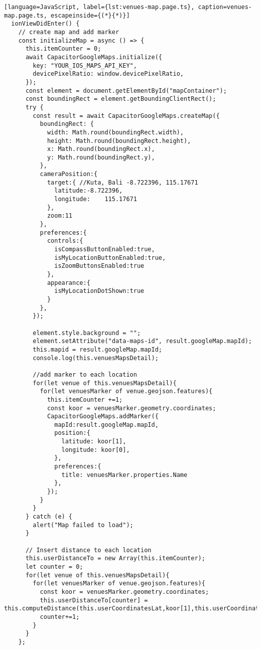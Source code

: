 \begin{lstlisting}[language=JavaScript, label={lst:venues-map.page.ts}, caption=venues-map.page.ts, escapeinside={(*}{*)}]
  ionViewDidEnter() {
    // create map and add marker
    const initializeMap = async () => {
      this.itemCounter = 0;
      await CapacitorGoogleMaps.initialize({
        key: "YOUR_IOS_MAPS_API_KEY",
        devicePixelRatio: window.devicePixelRatio,
      });
      const element = document.getElementById("mapContainer");
      const boundingRect = element.getBoundingClientRect();
      try {
        const result = await CapacitorGoogleMaps.createMap({
          boundingRect: {
            width: Math.round(boundingRect.width),
            height: Math.round(boundingRect.height),
            x: Math.round(boundingRect.x),
            y: Math.round(boundingRect.y),
          },
          cameraPosition:{
            target:{ //Kuta, Bali -8.722396, 115.17671
              latitude:-8.722396, 
              longitude: 	115.17671
            },
            zoom:11
          },
          preferences:{
            controls:{
              isCompassButtonEnabled:true,
              isMyLocationButtonEnabled:true,
              isZoomButtonsEnabled:true
            },
            appearance:{
              isMyLocationDotShown:true
            }
          },
        });
        
        element.style.background = "";
        element.setAttribute("data-maps-id", result.googleMap.mapId);
        this.mapid = result.googleMap.mapId;
        console.log(this.venuesMapsDetail);
        
        //add marker to each location
        for(let venue of this.venuesMapsDetail){
          for(let venuesMarker of venue.geojson.features){
            this.itemCounter +=1;
            const koor = venuesMarker.geometry.coordinates;  
            CapacitorGoogleMaps.addMarker({
              mapId:result.googleMap.mapId,
              position:{
                latitude: koor[1],
                longitude: koor[0],
              },
              preferences:{
                title: venuesMarker.properties.Name
              },
            });     
          }
        }
      } catch (e) {
        alert("Map failed to load");
      }
  
      // Insert distance to each location
      this.userDistanceTo = new Array(this.itemCounter);
      let counter = 0;
      for(let venue of this.venuesMapsDetail){
        for(let venuesMarker of venue.geojson.features){
          const koor = venuesMarker.geometry.coordinates;  
          this.userDistanceTo[counter] = this.computeDistance(this.userCoordinatesLat,koor[1],this.userCoordinatesLng,koor[0]);
          counter+=1;
        }
      }
    };


\end{lstlisting}
